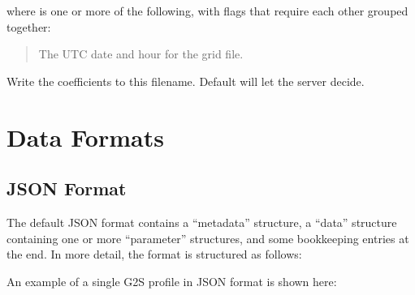 \documentclass[letterpaper,10pt,english]{sphinxmanual}
\begin{document}
\sphinxAtStartPar
where \sphinxcode{\sphinxupquote{{[}flags{]}}} is one or more of the following, with flags that require each other grouped together:

\sphinxAtStartPar
{}
\begin{quote}

\sphinxAtStartPar
The UTC date and hour for the grid file.
\end{quote}

\sphinxAtStartPar
{}
\begin{description}
\sphinxAtStartPar
Write the coefficients to this filename.  Default will let the server decide.

\sphinxAtStartPar
{}

\end{description}

\sphinxstepscope


\section{Data Formats}
\label{\detokenize{formats:data-formats}}\label{\detokenize{formats:formats}}\label{\detokenize{formats::doc}}

\subsection{JSON Format}
\label{\detokenize{formats:json-format}}
\sphinxAtStartPar
The default JSON format contains a “metadata” structure, a “data” structure containing one or more “parameter” structures, and some bookkeeping entries at the end.  In more detail, the format is structured as follows:

\sphinxAtStartPar
{}

\sphinxAtStartPar
An example of a single G2S profile in JSON format is shown here:
\end{document}
